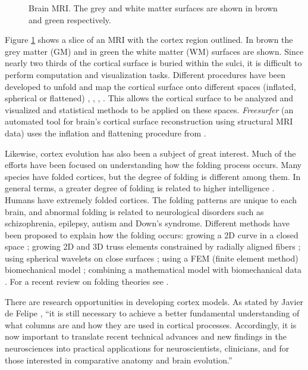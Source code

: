 \begin{figure}[htb]
 \centering 
 \caption[Brain MRI.]{Brain MRI. The grey and white matter surfaces are shown in brown and green respectively.}
 \label{fig:MRIimage}  
\end{figure}

Figure \ref{fig:MRIimage} shows a slice of an MRI with the cortex region outlined. In brown the grey matter (GM) and in green the white matter (WM) surfaces are shown.
Since nearly two thirds of the cortical surface is buried within the sulci, it is difficult to perform computation and visualization tasks. 
Different procedures have been developed to unfold and map the cortical surface onto different spaces (inflated, spherical or flattened)
\cite{drury_computerized_1996}, \cite{hermosillo_unfolding_1999}, \cite{fischl_cortical_1999}, \cite{pons_area_2004}. 
This allows the cortical surface to be analyzed and visualized and statistical methods to be applied on these spaces.
\textit{Freesurfer} (an automated tool for brain's cortical surface reconstruction using structural MRI data)
uses the inflation and flattening procedure from \cite{fischl_cortical_1999}. 

Likewise, cortex evolution has also been a subject of great interest.
Much of the efforts have been focused on understanding how the folding process occurs.
Many species have folded cortices, but the degree of folding is different among them.
In general terms, a greater degree of folding is related to higher intelligence \cite{buettner1964evolutionary}.
Humans have extremely folded cortices.
The folding patterns are 
unique to each brain, and abnormal folding is related to 
neurological disorders such as schizophrenia, epilepsy, autism and Down's syndrome.
Different methods have been proposed to explain how the folding occurs: 
growing a 2D curve in a closed space \cite{raghavan1997continuum}; 
growing 2D and 3D truss elements constrained by radially aligned fibers \cite{toro2005morphogenetic}; 
using spherical wavelets on close surfaces \cite{yu2007cortical}; 
using a FEM (finite element method) biomechanical model \cite{geng2009biomechanisms};
combining a mathematical model with biomechanical data \cite{bayly2013mechanical}.
For a recent review on folding theories see \cite{filas2013mechanisms}.

There are research opportunities in developing cortex models. 
As stated by Javier de Felipe \cite{defelipe2012neocortical}, ``it is still necessary
to achieve a better fundamental understanding of what columns
are and how they are used in cortical processes. Accordingly, it
is now important to translate recent technical advances and
new findings in the neurosciences into practical applications for
neuroscientists, clinicians, and for those interested in comparative
anatomy and brain evolution.''

